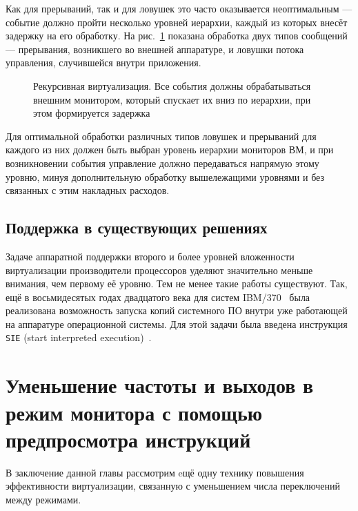 Как для прерываний, так и для ловушек это часто оказывается неоптимальным — событие должно пройти несколько уровней иерархии, каждый из которых внесёт задержку на его обработку. На рис.~\ref{fig:recursive-vm} показана обработка двух типов сообщений — прерывания, возникшего во внешней аппаратуре, и ловушки потока управления, случившейся внутри приложения.

\begin{figure}[htb]
    \centering
    \caption[Рекурсивная виртуализация]{Рекурсивная виртуализация. Все события должны обрабатываться внешним монитором, который спускает их вниз по иерархии, при этом формируется задержка}
    \label{fig:recursive-vm}
\end{figure}

Для оптимальной обработки различных типов ловушек и прерываний для каждого из них должен быть выбран уровень иерархии мониторов ВМ, и при возникновении события управление должно передаваться напрямую этому уровню, минуя дополнительную обработку вышележащими уровнями и без связанных с этим накладных расходов.

\subsection{Поддержка в существующих решениях}

Задаче аппаратной поддержки второго и более уровней вложенности виртуализации производители процессоров уделяют значительно меньше внимания, чем первому её уровню. Тем не менее такие работы существуют. Так, ещё в восьмидесятых годах двадцатого века для систем IBM/370~\cite{Osisek:1991:EIA:106229.120150} была реализована возможность запуска копий системного ПО внутри уже работающей на аппаратуре операционной системы. Для этой задачи была введена инструкция \texttt{SIE} (\abbr start interpreted execution)~\cite{sie-comp-arch}.

\section[Уменьшение частоты и выходов в монитор]{Уменьшение частоты и выходов в режим монитора с помощью предпросмотра инструкций}\label{sec:software-prescan}

В заключение данной главы рассмотрим eщё одну технику повышения эффективности виртуализации, связанную с уменьшением числа переключений между режимами.

